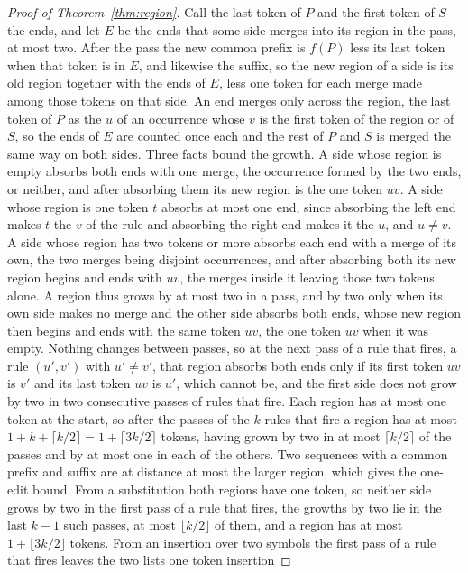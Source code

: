 \documentclass[11pt,a4paper]{article}
\theoremstyle{definition}
\theoremstyle{plain}
\begin{document}
\begin{proof}[Proof of Theorem~\ref{thm:region}]
Call the last token of \(P\) and the first token of \(S\) the ends, and let \(E\) be the ends that some side merges into
its region in the pass, at most two. After the pass the new common prefix is \(f(P)\) less its last token when that
token is in \(E\), and likewise the suffix, so the new region of a side is its old region together with the ends of
\(E\), less one token for each merge made among those tokens on that side. An end merges only across the region, the
last token of \(P\) as the \(u\) of an occurrence whose \(v\) is the first token of the region or of \(S\), so the ends
of \(E\) are counted once each and the rest of \(P\) and \(S\) is merged the same way on both sides. Three facts bound
the growth. A side whose region is empty absorbs both ends with one merge, the occurrence formed by the two ends, or
neither, and after absorbing them its new region is the one token \(uv\). A side whose region is one token \(t\) absorbs
at most one end, since absorbing the left end makes \(t\) the \(v\) of the rule and absorbing the right end makes it the
\(u\), and \(u \ne v\). A side whose region has two tokens or more absorbs each end with a merge of its own, the two
merges being disjoint occurrences, and after absorbing both its new region begins and ends with \(uv\), the merges
inside it leaving those two tokens alone. A region thus grows by at most two in a pass, and by two only when its own
side makes no merge and the other side absorbs both ends, whose new region then begins and ends with the same token
\(uv\), the one token \(uv\) when it was empty. Nothing changes between passes, so at the next pass of a rule that
fires, a rule \((u', v')\) with \(u' \ne v'\), that region absorbs both ends only if its first token \(uv\) is \(v'\)
and its last token \(uv\) is \(u'\), which cannot be, and the first side does not grow by two in two consecutive passes
of rules that fire. Each region has at most one token at the start, so after the passes of the \(k\) rules that fire a
region has at most \(1 + k + \lceil k/2 \rceil = 1 + \lceil 3k/2 \rceil\) tokens, having grown by two in at most
\(\lceil k/2 \rceil\) of the passes and by at most one in each of the others. Two sequences with a common prefix and
suffix are at distance at most the larger region, which gives the one-edit bound. From a substitution both regions have
one token, so neither side grows by two in the first pass of a rule that fires, the growths by two lie in the last
\(k - 1\) such passes, at most \(\lfloor k/2 \rfloor\) of them, and a region has at most \(1 + \lfloor 3k/2 \rfloor\)
tokens. From an insertion over two symbols the first pass of a rule that fires leaves the two lists one token insertion

\end{proof}
\end{document}
